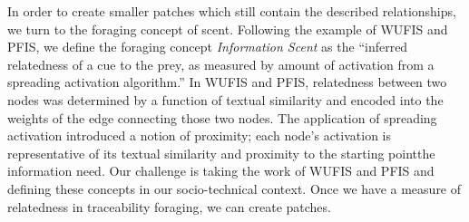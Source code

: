 In order to create smaller patches which still contain the described relationships, we turn to the foraging concept of scent. Following the example of WUFIS and PFIS, we define the foraging concept \textit{Information Scent} as the ``inferred relatedness of a cue to the prey, as measured by amount of activation from a spreading activation algorithm.'' In WUFIS and PFIS, relatedness between two nodes was determined by a function of textual similarity and encoded into the weights of the edge connecting those two nodes. The application of spreading activation introduced a notion of proximity; each node's activation is representative of its textual similarity and proximity to the starting point\textemdash the information need. Our challenge is taking the work of WUFIS and PFIS and defining these concepts in our socio-technical context. Once we have a measure of relatedness in traceability foraging, we can create patches.

